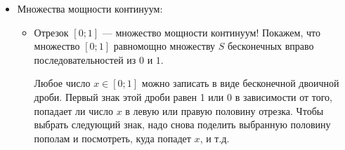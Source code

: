 \documentclass[pdftex, 12pt, a4paper]{article}
\theoremstyle{definition} %
\numberwithin{problem}{section}
\numberwithin{blits}{section}
\begin{document}
\begin{itemize}
\begin{itemize}
\end{itemize}



\item Множества мощности континуум:

\begin{itemize}
\item Отрезок $[0;1]$ --- множество мощности континуум!
Покажем, что множество $[0;1]$ равномощно множеству $S$ бесконечных вправо последовательностей из $0$ и $1$.

Любое число $x \in [0;1]$ можно записать в виде бесконечной двоичной дроби. Первый знак этой дроби равен 1 или 0 в зависимости от того, попадает ли число $x$ в левую или правую половину отрезка. Чтобы выбрать следующий знак, надо снова поделить выбранную половину пополам и посмотреть, куда попадет $x$, и т.д.



\end{itemize}
\end{itemize}
\end{document}
